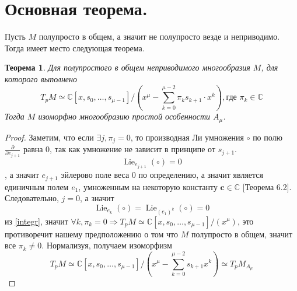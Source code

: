 \documentclass[a4paper, 10pt]{article}
\theoremstyle{plain}
\newtheorem{theorem}{Теорема}
\newcommand{\tang}[1][\hspace{0pt}]{\frac{\partial }{\partial #1}}
\begin{document}
\section{Основная теорема.}
Пусть \(M\) полупросто в общем, а значит не полупросто везде и неприводимо. Тогда имеет место следующая теорема.
\begin{theorem}
    Для полупростого в общем неприводимого многообразия \(M\), для которого выполнено
    \[
    T_pM \simeq \mathbb{C}\left[x, s_0, \dots, s_{\mu - 1}\right]/\left(x^{\mu} - \sum_{k = 0}^{\mu - 2} \pi_k s_{k+1} \cdot x^k\right), \text{где } \pi_k \in \mathbb{C}
    \]  Тогда \(M\) изоморфно многообразию простой особенности \(A_{\mu}\).
\end{theorem}
\begin{proof}
    Заметим, что если \(\exists j, \pi_j = 0\), то производная Ли умножения \(\circ\) по полю \(\tang[e_{j+1}]\) равна 0, так как умножение не зависит в принципе от \(s_{j+1}\).\[\operatorname{Lie}_{e_{j+1}}(\circ) = 0\], а значит \(e_{j+1}\) эйлерово поле веса 0 по определению, а значит является единичным полем \(e_1\), умноженным на некоторую константу \(\mathbf{c}\in \mathbb{C}\) [Теорема 6.2]\cite{hertling1999multiplicationtangentbundle}. Следовательно, \(j=0\), а значит \[\operatorname{Lie}_{e_k}(\circ) = \operatorname{Lie}_{(e_1)^k}(\circ) = 0 \] из \ref{integr}, значит \(\forall k, \pi_k =0 \Rightarrow T_pM \simeq \mathbb{C}\left[x, s_0, \dots, s_{\mu - 1}\right]/ (x^\mu)\), это противоречит нашему предположению о том что \(M\) полупросто в общем, значит все \(\pi_k \neq 0\). Нормализуя, получаем изоморфизм \[ T_pM \simeq \mathbb{C}\left[x, s_0, \dots, s_{\mu - 1}\right]/\left(x^{\mu} - \sum_{k = 0}^{\mu - 2} s_{k+1} x^k\right)\simeq T_pM_{A_\mu}\]
\end{proof}
\end{document}
